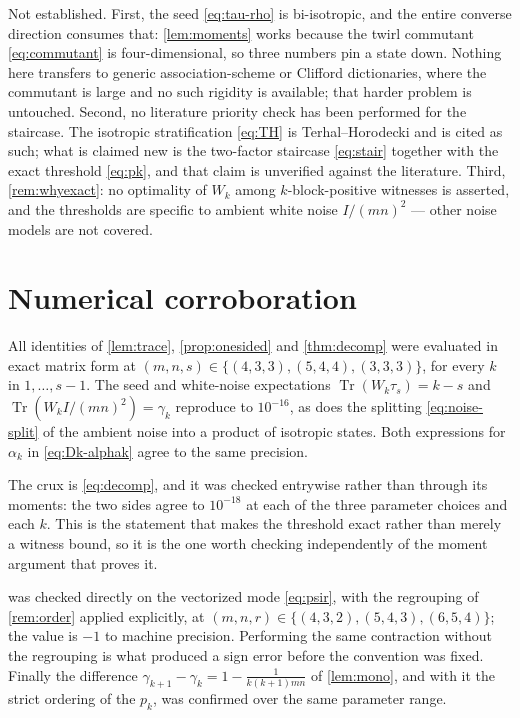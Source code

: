 \documentclass[11pt,reqno]{amsart}
\theoremstyle{plain}
\theoremstyle{remark}
\DeclareMathOperator{\Tr}{Tr}
\begin{document}
Not established.  First, the seed \cref{eq:tau-rho} is bi-isotropic, and the
entire converse direction consumes that: \cref{lem:moments} works because the
twirl commutant \cref{eq:commutant} is four-dimensional, so three numbers pin a
state down.  Nothing here transfers to generic association-scheme or Clifford
dictionaries, where the commutant is large and no such rigidity is available;
that harder problem is untouched.  Second, no literature priority check has
been performed for the staircase.  The isotropic stratification \cref{eq:TH} is
Terhal--Horodecki \cite{TerhalHorodecki2000} and is cited as such; what is
claimed new is the two-factor staircase \cref{eq:stair} together with the exact
threshold \cref{eq:pk}, and that claim is unverified against the literature.
Third, \cref{rem:whyexact}: no optimality of $W_k$ among $k$-block-positive
witnesses is asserted, and the thresholds are specific to ambient white noise
$I/(mn)^2$ --- other noise models are not covered.

\section*{Numerical corroboration}

All identities of \cref{lem:trace}, \cref{prop:onesided} and \cref{thm:decomp}
were evaluated in exact matrix form at
$(m,n,s)\in\{(4,3,3),(5,4,4),(3,3,3)\}$, for every $k$ in $1,\ldots,s-1$.  The
seed and white-noise expectations $\Tr(W_k\tau_s)=k-s$ and
$\Tr(W_kI/(mn)^2)=\gamma_k$ reproduce to $10^{-16}$, as does the splitting
\cref{eq:noise-split} of the ambient noise into a product of isotropic states.
Both expressions for $\alpha_k$ in \cref{eq:Dk-alphak} agree to the same
precision.

The crux is \cref{eq:decomp}, and it was checked entrywise rather than through
its moments: the two sides agree to $10^{-18}$ at each of the three parameter
choices and each $k$.  This is the statement that makes the threshold exact
rather than merely a witness bound, so it is the one worth checking
independently of the moment argument that proves it.

 was checked directly on the vectorized mode
\cref{eq:psir}, with the regrouping of \cref{rem:order} applied explicitly,
at $(m,n,r)\in\{(4,3,2),(5,4,3),(6,5,4)\}$; the value is $-1$ to machine
precision.  Performing the same contraction without the regrouping is what
produced a sign error before the convention was fixed.  Finally the difference
$\gamma_{k+1}-\gamma_k=1-\frac1{k(k+1)mn}$ of \cref{lem:mono}, and with it the
strict ordering of the $p_k$, was confirmed over the same parameter range.
\end{document}
